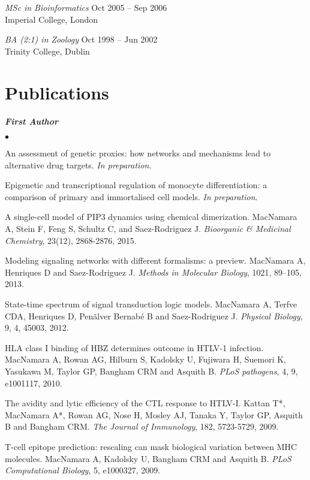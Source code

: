 \documentclass[overlapped, line, 11pt, letterpaper]{res}
\renewenvironment{itemize}{
\begin{list}{$\bullet$}
{\setlength{\itemsep}{0cm}}
}{\end{list}}
\begin{document}
\begin{resume}
\emph{MSc in Bioinformatics} \hfill Oct 2005 -- Sep 2006\\
Imperial College, London
 
\emph{BA (2:1) in Zoology} \hfill Oct 1998 -- Jun 2002\\
Trinity College, Dublin

\section{Publications}
\textbf{\emph{First Author}}
\begin{itemize}
\item An assessment of genetic proxies: how networks and mechanisms lead to alternative drug targets. \emph{In preparation}.
\item Epigenetic and transcriptional regulation of monocyte differentiation: a comparison of primary and immortalised cell models. \emph{In preparation}.
\item A single-cell model of PIP3 dynamics using chemical dimerization. MacNamara A, Stein F, Feng S, Schultz C, and Saez-Rodriguez J. \emph{Bioorganic \& Medicinal Chemistry}, 23(12), 2868-2876, 2015.
\item Modeling signaling networks with different formalisms: a preview. MacNamara A, Henriques D and Saez-Rodriguez J. \emph{Methods in Molecular Biology}, 1021, 89–105, 2013.
\item State-time spectrum of signal transduction logic models. MacNamara A, Terfve CDA, Henriques D, Pen\~alver Bernab\'e B and Saez-Rodriguez J. \emph{Physical Biology}, 9, 4, 45003, 2012.
\item HLA class I binding of HBZ determines outcome in HTLV-1 infection. MacNamara A, Rowan AG, Hilburn S, Kadolsky U, Fujiwara H, Suemori K, Yasukawa M, Taylor GP, Bangham CRM and Asquith B. \emph{PLoS pathogens}, 4, 9, e1001117, 2010.
\item The avidity and lytic efficiency of the CTL response to HTLV-I. Kattan T*, MacNamara A*, Rowan AG, Nose H, Mosley AJ, Tanaka Y, Taylor GP, Asquith B and Bangham CRM. \emph{The Journal of Immunology}, 182, 5723-5729, 2009.
\item T-cell epitope prediction: rescaling can mask biological variation between MHC molecules. MacNamara A, Kadolsky U, Bangham CRM and Asquith B. \emph{PLoS Computational Biology}, 5, e1000327, 2009.
\end{itemize}


\end{resume}
\end{document}
